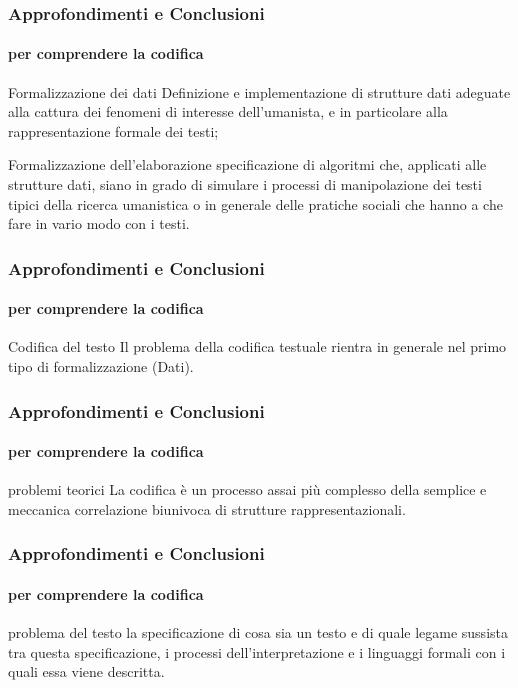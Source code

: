 \begin{frame}
	\frametitle{Approfondimenti e Conclusioni}
	\framesubtitle{per comprendere la codifica}
	\addtocounter{nframe}{1}

	\begin{block}{Formalizzazione dei dati}
		Definizione e implementazione di strutture dati adeguate alla cattura dei fenomeni di interesse dell’umanista, e in particolare alla rappresentazione formale dei testi;
	\end{block}

	\begin{block}{Formalizzazione dell'elaborazione}
		specificazione di algoritmi che, applicati alle strutture dati, siano in grado di simulare i processi di manipolazione dei testi tipici della ricerca umanistica o in generale delle pratiche sociali che hanno a che fare in vario modo con i testi.
	\end{block}

\end{frame}


\begin{frame}
	\frametitle{Approfondimenti e Conclusioni}
	\framesubtitle{per comprendere la codifica}
	\addtocounter{nframe}{1}

	\begin{block}{Codifica del testo}
		Il problema della codifica testuale rientra in generale nel primo tipo di formalizzazione (Dati).
	\end{block}

\end{frame}

\begin{frame}
	\frametitle{Approfondimenti e Conclusioni}
	\framesubtitle{per comprendere la codifica}
	\addtocounter{nframe}{1}

	\begin{block}{problemi teorici}
		La codifica è un processo assai più complesso della semplice e meccanica correlazione biunivoca di strutture rappresentazionali.
	\end{block}

\end{frame}

\begin{frame}
	\frametitle{Approfondimenti e Conclusioni}
	\framesubtitle{per comprendere la codifica}
	\addtocounter{nframe}{1}

	\begin{block}{problema del testo}
		la specificazione di cosa sia un testo e di quale legame sussista tra questa specificazione, i processi dell’interpretazione e i linguaggi formali con i quali essa viene descritta.
	\end{block}

\end{frame}

